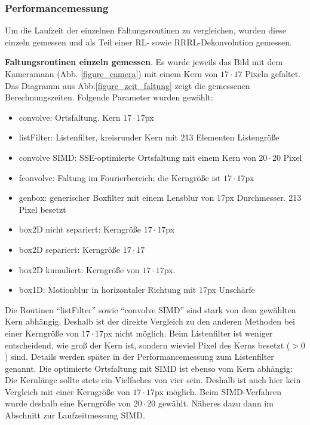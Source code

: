 \documentclass[a4paper,12pt]{article}
\begin{document}
\subsubsection{Performancemessung}
Um die Laufzeit der einzelnen Faltungsroutinen zu vergleichen, wurden diese
einzeln gemessen und als Teil einer RL- sowie RRRL-Dekonvolution gemessen.

\textbf{Faltungsroutinen einzeln gemessen}. Es wurde jeweils das Bild mit dem
Kameramann (Abb. \ref{figure_camera}) mit einem Kern von $17 \cdot 17$ Pixeln
gefaltet. Das Diagramm aus Abb.\ref{figure_zeit_faltung} zeigt die gemessenen
Berechnungszeiten.
Folgende Parameter wurden gewählt:
\begin{itemize}
  \itemsep -1pt
  \item convolve: Ortsfaltung. Kern $17 \cdot 17$px
  \item listFilter: Listenfilter, kreisrunder Kern mit 213 Elementen
  Listengröße
  \item convolve SIMD: SSE-optimierte Ortsfaltung mit einem Kern von $20 \cdot
  20$ Pixel
  \item fconvolve: Faltung im Fourierbereich; die Kerngröße ist $17 \cdot 17$px
  \item genbox: generischer Boxfilter mit einem Lensblur von 17px Durchmesser.
  213 Pixel besetzt
  \item box2D nicht separiert: Kerngröße $17 \cdot 17$px
  \item box2D separiert: Kerngröße $17 \cdot 17$
  \item box2D kumuliert: Kerngröße von $17 \cdot 17$px.
  \item box1D: Motionblur in horizontaler Richtung mit 17px Unschärfe
\end{itemize}

Die Routinen "`listFilter"' sowie "`convolve SIMD"' sind stark von dem gewählten
Kern abhängig. Deshalb ist der direkte Vergleich zu den anderen Methoden
bei einer Kerngröße von $17 \cdot 17$px nicht möglich. Beim Listenfilter ist
weniger entscheidend, wie groß der Kern ist, sondern wieviel Pixel des Kerns
besetzt ($>0$) sind. Details werden später in der Performancemessung zum
Listenfilter genannt. Die optimierte Ortsfaltung mit SIMD ist ebenso vom Kern abhängig: Die
Kernlänge sollte stets ein Vielfaches von vier sein. Deshalb ist auch hier kein
Vergleich mit einer Kerngröße von $17 \cdot 17$px möglich. Beim SIMD-Verfahren
wurde deshalb eine Kerngröße von $20 \cdot 20$ gewählt. Näheres dazu dann im
Abschnitt zur Laufzeitmessung SIMD.
\end{document}

